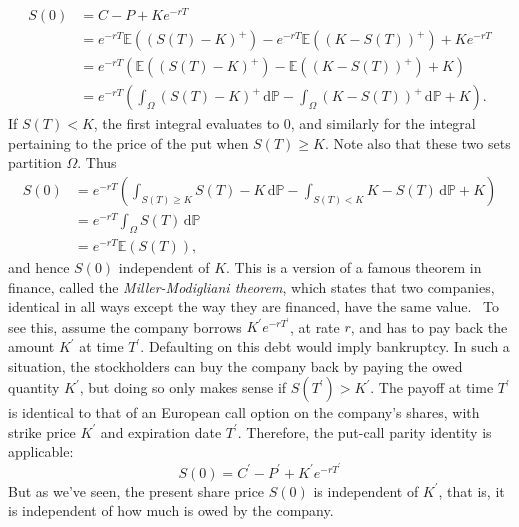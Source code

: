 \documentclass[]{article}
\newcommand{\EE}{\mathbb{E}}
\newcommand{\PP}{\mathbb{P}}
\theoremstyle{definition}
\theoremstyle{remark}
\begin{document}
\begin{align*}
	S(0) &= C - P + Ke^{-rT} \\
	&= e^{-rT} \EE((S(T) - K)^+) - e^{-rT} \EE((K - S(T))^+) + Ke^{-rT} \\
	&= e^{-rT}( \EE((S(T) - K)^+) -  \EE((K - S(T))^+) + K) \\
	&= e^{-rT}  
	\left( \int_\Omega (S(T) - K)^+ \, \text{d} \PP
	- \int_\Omega (K - S(T))^+ \, \text{d}  \PP + K
	\right ).
\end{align*}
If $S(T) < K$, the first integral evaluates to $0$, and similarly for the integral pertaining to the price of the put when $S(T) \geq K$. Note also that these two sets partition $\Omega$. Thus
\begin{align*}
	S(0) &= e^{-rT}
	\left(
	\int_{S(T) \geq K} S(T)-K \, \text{d} \PP
	-
	\int_{S(T) < K} K - S(T) \, \text{d} \PP + K
	\right) \\
	&= e^{-rT} \int_\Omega S(T) \, \text{d}\PP \\
	&= e^{-rT}\EE(S(T)),
\end{align*}
and hence $S(0)$ independent of $K$. This is a version of a famous theorem in finance, called the \textit{Miller-Modigliani theorem}, which states that two companies, identical in all ways except the way they are financed, have the same value.~\cite{capinski2004measure} To see this, assume the company borrows $K^\prime e^{-rT^\prime}$, at rate $r$,  and has to pay back the amount $K^\prime$ at time $T^\prime$. Defaulting on this debt would imply bankruptcy. In such a situation, the stockholders can buy the company back by paying the owed quantity $K^\prime$, but doing so only makes sense if $S(T^\prime) > K^\prime$. The payoff at time $T^\prime$ is identical to that of an European call option on the company's shares, with strike price $K^\prime$ and expiration date $T^\prime$. Therefore, the put-call parity identity is applicable:
\[
 S(0)  = C^\prime - P^\prime + K^\prime e^{-rT^\prime}
\]
But as we've seen, the present share price $S(0)$ is independent of $K^\prime$, that is, it is independent of how much is owed by the company. 

\nocite{*}

 
\end{document}
